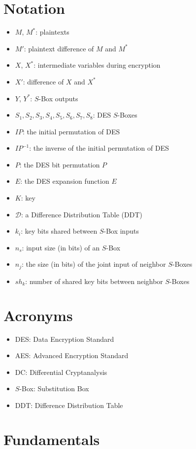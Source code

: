\documentclass{report}
\begin{document}
\section{Notation}
\begin{itemize}
    \item $M$, $M^*$: plaintexts
    \item $M'$: plaintext difference of $M$ and $M^*$
    \item $X$, $X^*$: intermediate variables during encryption
    \item $X'$: difference of $X$ and $X^*$
    \item $Y$, $Y^*$: $S$-Box outputs
    \item $S_1, S_2, S_3, S_4, S_5, S_6, S_7, S_8$: DES $S$-Boxes
    \item $IP$: the initial permutation of DES
    \item $IP^{-1}$: the inverse of the initial permutation of DES
    \item $P$: the DES bit permutation $P$
    \item $E$: the DES expansion function $E$
    \item $K$: key
    \item $\mathcal{D}$: a Difference Distribution Table (DDT)
    \item $k_i$: key bits shared between $S$-Box inputs
    \item $n_s$: input size (in bits) of an $S$-Box
    \item $n_j$: the size (in bits) of the joint input of neighbor $S$-Boxes
    \item $sh_k$: number of shared key bits between neighbor $S$-Boxes
\end{itemize}

\section{Acronyms}
\begin{itemize}
    \item DES: Data Encryption Standard
    \item AES: Advanced Encryption Standard
    \item DC: Differential Cryptanalysis
    \item $S$-Box: Substitution Box
    \item DDT: Difference Distribution Table
\end{itemize}

\section{Fundamentals}
\end{document}
